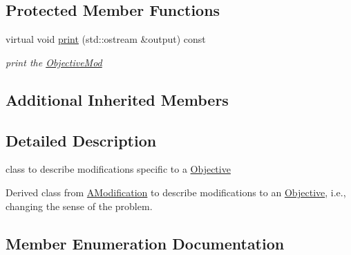 \subsection*{Protected Member Functions}
\begin{DoxyCompactItemize}
\item 
\mbox{\label{class_s_m_spp__di__unipi__it_1_1_objective_mod_a2e7b9c9148a98c5c342e8c25cac95926}} 
virtual void \mbox{\hyperlink{class_s_m_spp__di__unipi__it_1_1_objective_mod_a2e7b9c9148a98c5c342e8c25cac95926}{print}} (std\+::ostream \&output) const
\begin{DoxyCompactList}\small\item\em print the \mbox{\hyperlink{class_s_m_spp__di__unipi__it_1_1_objective_mod}{Objective\+Mod}} \end{DoxyCompactList}\end{DoxyCompactItemize}
\subsection*{Additional Inherited Members}


\subsection{Detailed Description}
class to describe modifications specific to a \mbox{\hyperlink{class_s_m_spp__di__unipi__it_1_1_objective}{Objective}} 

Derived class from \mbox{\hyperlink{class_s_m_spp__di__unipi__it_1_1_a_modification}{A\+Modification}} to describe modifications to an \mbox{\hyperlink{class_s_m_spp__di__unipi__it_1_1_objective}{Objective}}, i.\+e., changing the sense of the problem. 

\subsection{Member Enumeration Documentation}
\mbox{\label{class_s_m_spp__di__unipi__it_1_1_objective_mod_addf23a536d33ccbb3c19b1d46e514b9d}} 
